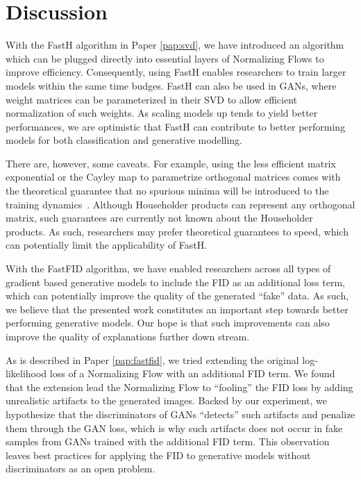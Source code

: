 \documentclass[11pt,a4paper,twoside,openright,final]{memoir}
\newcommand*{\paperref}[1]{Paper \hyperref[#1]{\ref{#1}}}
\begin{document}
 
\section{Discussion}\label{sec:nn-discussion}

With the FastH algorithm in \paperref{pap:svd}, we have introduced an algorithm which can be plugged directly into essential layers of Normalizing Flows to improve efficiency.
Consequently, using FastH enables researchers to train larger models within the same time budges.
FastH can also be used in GANs, where weight matrices can be parameterized in their SVD to allow efficient normalization of such weights.
As scaling models up tends to yield better performances, we are optimistic that FastH can contribute to better performing models for both classification and generative modelling.

There are, however, some caveats. 
For example, using the less efficient matrix exponential or the Cayley map to parametrize orthogonal matrices comes with the theoretical guarantee that no spurious minima will be introduced to the training dynamics~\cite{matrixexp1}.  
Although Householder products can represent any orthogonal matrix, such guarantees are currently not known about the Householder products. 
As such, researchers may prefer theoretical guarantees to speed, which can potentially limit the applicability of FastH.

With the FastFID algorithm, we have enabled researchers across all types of gradient based generative models to include the FID as an additional loss term, which can potentially improve the quality of the generated ``fake'' data.
As such, we believe that the presented work constitutes an important step towards better performing generative models.
Our hope is that such improvements can also improve the quality of explanations further down stream. 

As is described in \paperref{pap:fastfid}, we tried extending the original log-likelihood loss of a Normalizing Flow with an additional FID term.
We found that the extension lead the Normalizing Flow to ``fooling'' the FID loss by adding unrealistic artifacts to the generated images. 
Backed by our experiment, we hypothesize that the discriminators of GANs ``detects'' such artifacts and penalize them through the GAN loss, which is why such artifacts does not occur in fake samples from GANs trained with the additional FID term.
This observation leaves best practices for applying the FID to generative models without discriminators as an open problem.
\end{document}
